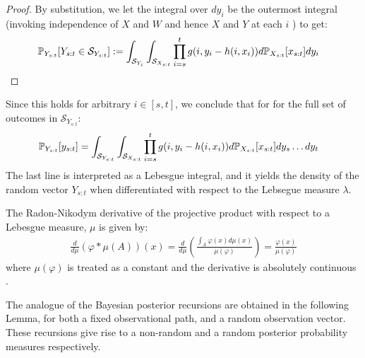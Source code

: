 \begin{lemma}
\begin{proof}
By substitution, we let the integral over $dy_i$ be the outermost integral (invoking independence of $X$ and $W$ and hence $X$ and $Y$ at each $i$ ) to get:
\begin{align}
\mathbb{P}_{Y_{s:t}}{[Y_{s:t} \in \mathcal{S}_{Y_{s:t}}]} &:= \int_{ \mathcal{S}_{Y_i}} \int_{\mathcal{S}_{X_{s:t}}} \prod_{i=s}^t  g(i, y_i - h(i, x_i))  d\mathbb{P}_{X_{s:t}}{[x_{s:t}]}  dy_i 
\end{align} 
\end{proof} Since this holds for arbitrary $i \in [s, t]$, we conclude that for for the full set of outcomes in $\mathcal{S}_{Y_{s:t}}$:
\begin{align}
\mathbb{P}_{Y_{s:t}}{[{y_{s:t}}]} &= \int_{ \mathcal{S}_{Y_{s:t}} } \int_{\mathcal{S}_{X_{s:t}}} \prod_{i=s}^t  g(i, y_i - h(i, x_i))  d\mathbb{P}_{X_{s:t}}{[x_{s:t}]}  dy_s \hdots dy_t 
\end{align} The last line is interpreted as a Lebesgue integral, and it yields the density of the random vector $Y_{s:t}$ when differentiated with respect to the Lebsegue measure $\lambda$. 
\end{lemma} 
\begin{defn}
	The Radon-Nikodym derivative of the projective product with respect to a Lebesgue measure, $\mu$ is given by:
	\begin{align}
	\frac{d}{d\mu} (\varphi * \mu(A))(x) = \frac{d}{d\mu} \left(\frac{\int_A \varphi(x)  d\mu(x) }{\mu(\varphi)} \right)= \frac{ \varphi(x) }{\mu(\varphi)}
	\end{align} where $\mu(\varphi)$ is treated as a constant and the derivative is absolutely continuous \cite{bain2009}. 
\end{defn}
The analogue of the Bayesian posterior recursions are obtained in the following Lemma, for both a fixed observational path, and a random observation vector. These recursions give rise to a non-random and a random posterior probability measures respectively. 
